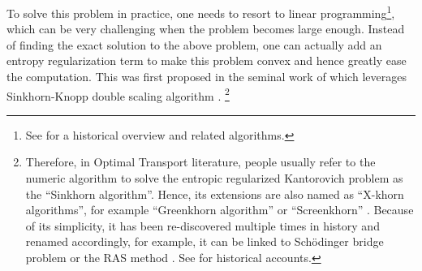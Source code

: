 To solve this problem in practice, one needs to resort to linear programming\footnote{
  See \citet[Chapter 3]{peyre2019} for a historical overview and related algorithms.
}, which can be very challenging when the problem becomes large enough.
Instead of finding the exact solution to the above problem, one can actually add an entropy regularization term
to make this problem convex and hence greatly ease the computation.
This was first proposed in the seminal work of \citet{cuturi2013}
which leverages Sinkhorn-Knopp double scaling algorithm \citep{sinkhorn1964,sinkhorn1967,knight2008}.
\footnote{
  Therefore, in Optimal Transport literature,
  people usually refer to the numeric algorithm to solve the entropic regularized Kantorovich problem
  as the ``Sinkhorn algorithm''.
  Hence, its extensions are also named as ``X-khorn algorithms'',
  for example ``Greenkhorn algorithm'' \citep{altschuler2017} or ``Screenkhorn'' \citep{alaya2019}.
  Because of its simplicity, it has been re-discovered multiple times in history and renamed accordingly,
  for example,
  it can be linked to Sch\"odinger bridge problem \citep{schrodinger1931} or the RAS method \citep{bacharach1970}.
  See \citet{knight2008,leonard2013,modin2024} for historical accounts.
}

